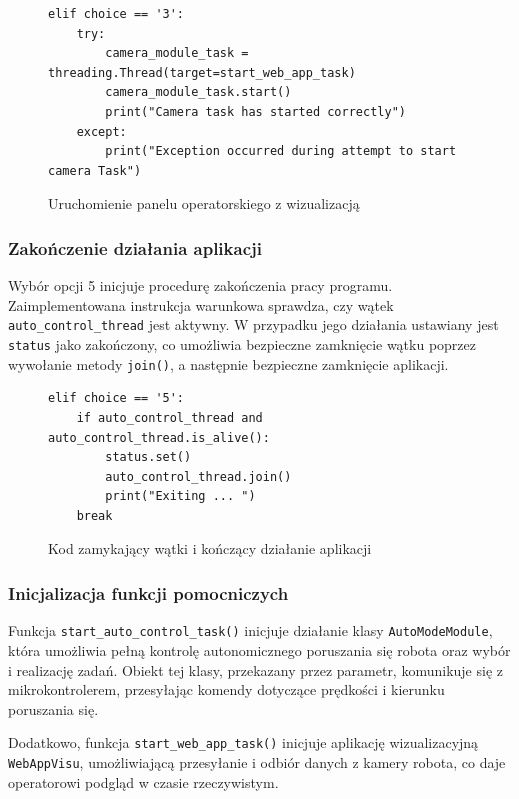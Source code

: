 \begin{figure}[H]
  \centering
  \begin{lstlisting}
elif choice == '3':
    try:
        camera_module_task = threading.Thread(target=start_web_app_task)
        camera_module_task.start()
        print("Camera task has started correctly")
    except:
        print("Exception occurred during attempt to start camera Task")
  \end{lstlisting}
  \caption{Uruchomienie panelu operatorskiego z wizualizacją}
  \label{fig:panel_task}
\end{figure}

\subsubsection{Zakończenie działania aplikacji}

Wybór opcji 5 inicjuje procedurę zakończenia pracy programu. Zaimplementowana instrukcja warunkowa sprawdza, czy wątek \texttt{auto\_control\_thread} jest aktywny. W przypadku jego działania ustawiany jest \texttt{status} jako zakończony, co umożliwia bezpieczne zamknięcie wątku poprzez wywołanie metody \texttt{join()}, a następnie bezpieczne zamknięcie aplikacji.

\begin{figure}[H]
  \centering
  \begin{lstlisting}
elif choice == '5':
    if auto_control_thread and auto_control_thread.is_alive():
        status.set()
        auto_control_thread.join()
        print("Exiting ... ")
    break
  \end{lstlisting}
  \caption{Kod zamykający wątki i kończący działanie aplikacji}
  \label{fig:app_exit}
\end{figure}

\subsubsection{Inicjalizacja funkcji pomocniczych}
 
Funkcja \texttt{start\_auto\_control\_task()} inicjuje działanie klasy \texttt{AutoModeModule}, która umożliwia pełną kontrolę autonomicznego poruszania się robota oraz wybór i realizację zadań. Obiekt tej klasy, przekazany przez parametr, komunikuje się z mikrokontrolerem, przesyłając komendy dotyczące prędkości i kierunku poruszania się.

Dodatkowo, funkcja \texttt{start\_web\_app\_task()} inicjuje aplikację wizualizacyjną \texttt{WebAppVisu}, umożliwiającą przesyłanie i odbiór danych z kamery robota, co daje operatorowi podgląd w czasie rzeczywistym.

